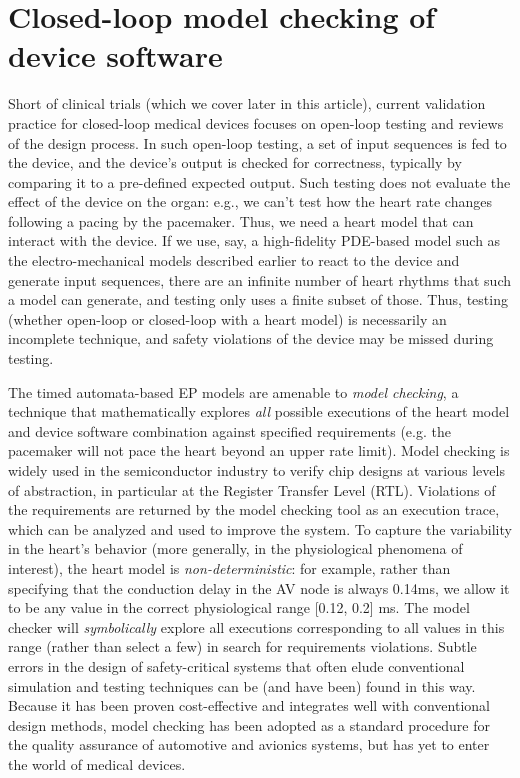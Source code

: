 \section{Closed-loop model checking of device software}
Short of clinical trials (which we cover later in this article), current validation practice for closed-loop medical devices focuses on open-loop testing and reviews of the design process.
In such open-loop testing, a set of input sequences is fed to the device, and the device's output is checked for correctness, typically by comparing it to a pre-defined expected output.
Such testing does not evaluate the effect of the device on the organ: e.g., we can't test how the heart rate changes following a pacing by the pacemaker.
Thus, we need a heart model that can interact with the device. 
If we use, say, a high-fidelity PDE-based model such as the electro-mechanical models described earlier to react to the device and generate input sequences, there are an infinite number of heart rhythms that such a model can generate, and testing only uses a finite subset of those.
Thus, testing (whether open-loop or closed-loop with a heart model) is necessarily an incomplete technique, and safety violations of the device may be missed during testing.

The timed automata-based EP models are amenable to \emph{model checking}, a technique that mathematically explores \emph{all} possible executions of the heart model and device software combination against specified requirements (e.g. the pacemaker will not pace the heart beyond an upper rate limit). 
Model checking is widely used in the semiconductor industry to verify chip designs at various levels of abstraction, in particular at the Register Transfer Level (RTL).
Violations of the requirements are returned by the model checking tool as an execution trace, which can be analyzed and used to improve the system. 
To capture the variability in the heart's behavior (more generally, in the physiological phenomena of interest), the heart model is \emph{non-deterministic}: for example, rather than specifying that the conduction delay in the AV node is always 0.14ms, we allow it to be any value in the correct physiological range [0.12, 0.2] ms.
The model checker will \emph{symbolically} explore all executions corresponding to all values in this range (rather than select a few) in search for requirements violations. Subtle errors in the design of safety-critical systems that often elude conventional simulation and testing techniques can be (and have been) found in this way. Because it has been proven cost-effective and integrates well with conventional design methods, model checking has been adopted as a standard procedure for the quality assurance of  automotive and avionics systems, but has yet to enter the world of medical devices.

